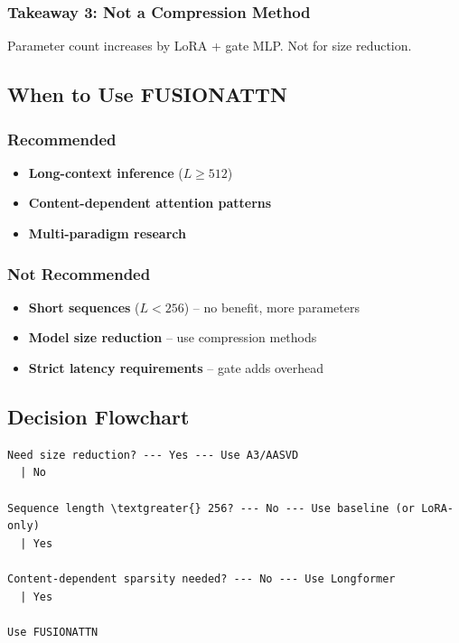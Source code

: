 \subsubsection{Takeaway 3: Not a Compression Method}

Parameter count increases by LoRA + gate MLP. Not for size reduction.

\subsection{When to Use FUSIONATTN}

\subsubsection{Recommended}

\begin{itemize}
\item \textbf{Long-context inference} ($L \geq 512$)
\item \textbf{Content-dependent attention patterns}
\item \textbf{Multi-paradigm research}

\end{itemize}
\subsubsection{Not Recommended}

\begin{itemize}
\item \textbf{Short sequences} ($L < 256$) -- no benefit, more parameters
\item \textbf{Model size reduction} -- use compression methods
\item \textbf{Strict latency requirements} -- gate adds overhead

\end{itemize}
\subsection{Decision Flowchart}

\begin{lstlisting}
Need size reduction? --- Yes --- Use A3/AASVD
  | No
   
Sequence length \textgreater{} 256? --- No --- Use baseline (or LoRA-only)
  | Yes
   
Content-dependent sparsity needed? --- No --- Use Longformer
  | Yes
   
Use FUSIONATTN
\end{lstlisting}

